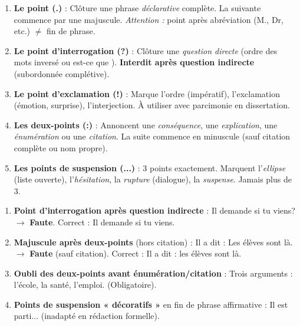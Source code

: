 \documentclass[11pt]{article}
\begin{document}
\begin{methode}
\begin{enumerate}
\item \textbf{Le point (.)} : Clôture une phrase \emph{déclarative} complète. La suivante commence par une majuscule. \emph{Attention :} point après abréviation (M., Dr, etc.) $\neq$ fin de phrase.
\item \textbf{Le point d'interrogation (?)} : Clôture une \emph{question directe} (ordre des mots inversé ou \og est-ce que \fg{}). \textbf{Interdit après question indirecte} (subordonnée complétive).
\item \textbf{Le point d'exclamation (!)} : Marque l'ordre (impératif), l'exclamation (émotion, surprise), l'interjection. À utiliser avec parcimonie en dissertation.
\item \textbf{Les deux-points (:)} : Annoncent une \emph{conséquence}, une \emph{explication}, une \emph{énumération} ou une \emph{citation}. La suite commence en minuscule (sauf citation complète ou nom propre).
\item \textbf{Les points de suspension (...)} : 3 points exactement. Marquent l'\emph{ellipse} (liste ouverte), l'\emph{hésitation}, la \emph{rupture} (dialogue), la \emph{suspense}. Jamais plus de 3.
\end{enumerate}
\begin{attention}
\begin{enumerate}
\item \textbf{Point d'interrogation après question indirecte} : \og Il demande si tu viens? \fg{} $\rightarrow$ \textbf{Faute}. Correct : \og Il demande si tu viens. \fg{}
\item \textbf{Majuscule après deux-points} (hors citation) : \og Il a dit : Les élèves sont là. \fg{} $\rightarrow$ \textbf{Faute} (sauf citation). Correct : \og Il a dit : les élèves sont là. \fg{}
\item \textbf{Oubli des deux-points avant énumération/citation} : \og Trois arguments : l'école, la santé, l'emploi. \fg{} (Obligatoire).
\item \textbf{Points de suspension « décoratifs »} en fin de phrase affirmative : \og Il est parti... \fg{} (inadapté en rédaction formelle).
\end{enumerate}
\end{attention}
\end{methode}
\end{document}
